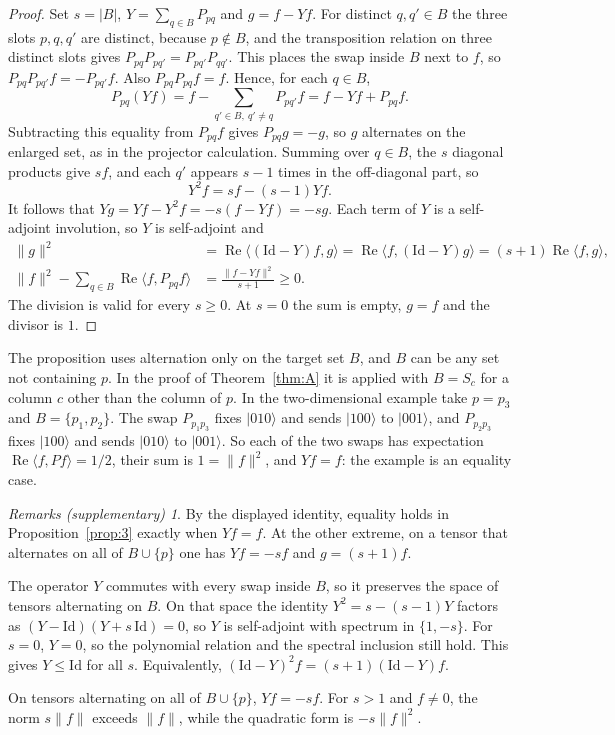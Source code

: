 \documentclass[11pt]{amsart}
\newcommand{\notlean}{supplementary}
\theoremstyle{definition}
\theoremstyle{remark}
\newtheorem*{remarks}{Remarks \textup{(\notlean)}}
\begin{document}
\begin{proof}
Set \(s=|B|\), \(Y=\sum_{q\in B}P_{pq}\) and \(g=f-Yf\). For distinct
\(q,q'\in B\) the three slots \(p,q,q'\) are distinct, because \(p\notin B\),
and the transposition relation on three distinct slots gives
\(P_{pq}P_{pq'}=P_{pq'}P_{qq'}\). This places the swap inside \(B\) next to
\(f\), so \(P_{pq}P_{pq'}f=-P_{pq'}f\). Also \(P_{pq}P_{pq}f=f\). Hence, for
each \(q\in B\),
\[
P_{pq}(Yf)=f-\sum_{q'\in B,\ q'\ne q}P_{pq'}f=f-Yf+P_{pq}f .
\]
Subtracting this equality from \(P_{pq}f\) gives \(P_{pq}g=-g\), so \(g\)
alternates on the enlarged set, as in the projector calculation.
Summing over \(q\in B\), the \(s\) diagonal products give \(sf\), and each
\(q'\) appears \(s-1\) times in the off-diagonal part, so
\[
Y^2 f=sf-(s-1)Yf .
\]
It follows that \(Yg=Yf-Y^2f=-s(f-Yf)=-sg\). Each term of \(Y\) is a
self-adjoint involution, so \(Y\) is self-adjoint and
\[
\begin{aligned}
\|g\|^2
 &=\operatorname{Re}\langle(\mathrm{Id}-Y)f,g\rangle
  =\operatorname{Re}\langle f,(\mathrm{Id}-Y)g\rangle
  =(s+1)\operatorname{Re}\langle f,g\rangle,\\
\|f\|^2-\sum_{q\in B}\operatorname{Re}\langle f,P_{pq}f\rangle
 &=\frac{\|f-Yf\|^2}{s+1}\ge0 .
\end{aligned}
\]
The division is valid for every \(s\ge0\). At \(s=0\) the sum is empty,
\(g=f\) and the divisor is \(1\).
\end{proof}

The proposition uses alternation only on the target set \(B\), and \(B\) can
be any set not containing \(p\). In the proof of Theorem~\ref{thm:A} it is
applied with \(B=S_c\) for a column \(c\) other than the column of \(p\). In
the two-dimensional example take \(p=p_3\) and \(B=\{p_1,p_2\}\). The swap
\(P_{p_1p_3}\) fixes \(\lvert010\rangle\) and sends \(\lvert100\rangle\) to
\(\lvert001\rangle\), and \(P_{p_2p_3}\) fixes \(\lvert100\rangle\) and sends
\(\lvert010\rangle\) to \(\lvert001\rangle\). So each of the two swaps has
expectation \(\operatorname{Re}\langle f,P f\rangle=1/2\), their sum is
\(1=\|f\|^2\), and \(Yf=f\): the example is an equality case.

\begin{remarks}
By the displayed identity, equality holds in
Proposition~\ref{prop:3} exactly when \(Yf=f\). At the other extreme, on a
tensor that alternates on all of \(B\cup\{p\}\) one has \(Yf=-sf\) and
\(g=(s+1)f\).

The operator \(Y\) commutes with every swap
inside \(B\), so it preserves the space of tensors alternating on \(B\). On
that space the identity \(Y^2=s-(s-1)Y\) factors as
\((Y-\mathrm{Id})(Y+s\,\mathrm{Id})=0\), so \(Y\) is self-adjoint with
spectrum in \(\{1,-s\}\). For \(s=0\), \(Y=0\), so the polynomial relation
and the spectral inclusion still hold. This gives \(Y\le\mathrm{Id}\)
for all \(s\). Equivalently,
\((\mathrm{Id}-Y)^2f=(s+1)(\mathrm{Id}-Y)f\).

On tensors alternating on all of \(B\cup\{p\}\), \(Yf=-sf\).
For \(s>1\) and \(f\ne0\), the norm \(s\|f\|\) exceeds \(\|f\|\),
while the quadratic form is \(-s\|f\|^2\).

\end{remarks}
\end{document}
